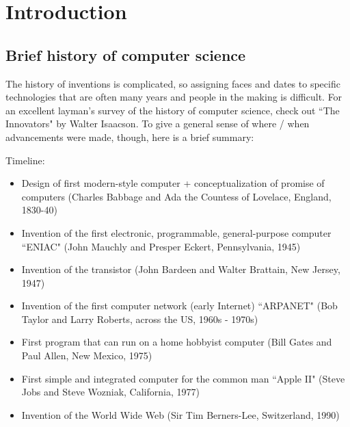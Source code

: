 \chapter{Introduction}

\section{Brief history of computer science}

The history of inventions is complicated, so assigning faces and dates to specific technologies that are often many years and people in the making is difficult. For an excellent layman's survey of the history of computer science, check out ``The Innovators" by Walter Isaacson. To give a general sense of where / when advancements were made, though, here is a brief summary: 

Timeline:
\begin{itemize}
\item Design of first modern-style computer + conceptualization of promise of computers (Charles Babbage and Ada the Countess of Lovelace, England, 1830-40)
\item Invention of the first electronic, programmable, general-purpose computer ``ENIAC" (John Mauchly and Presper Eckert, Pennsylvania, 1945)
\item Invention of the transistor (John Bardeen and Walter Brattain, New Jersey, 1947)
\item Invention of the first computer network (early Internet) ``ARPANET" (Bob Taylor and Larry Roberts, across the US, 1960s - 1970s)
\item First program that can run on a home hobbyist computer (Bill Gates and Paul Allen, New Mexico, 1975)
\item First simple and integrated computer for the common man ``Apple II" (Steve Jobs and Steve Wozniak, California, 1977)
\item Invention of the World Wide Web (Sir Tim Berners-Lee, Switzerland, 1990)
\end{itemize}

